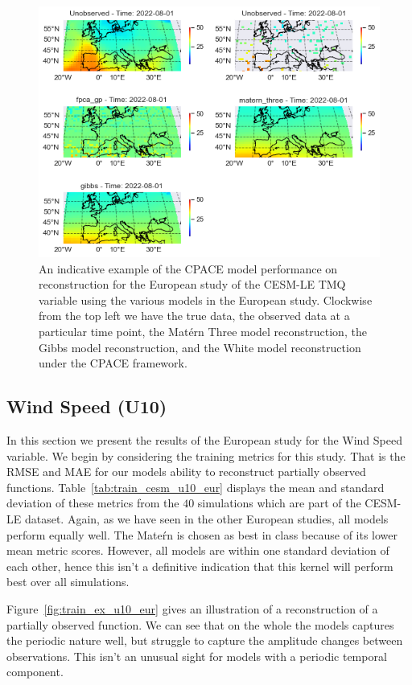 \begin{figure}
	\centering
	\includegraphics[width=\textwidth]{full_ex_tmq_eur}
	\caption{An indicative example of the CPACE model performance on reconstruction for the European study of the CESM-LE TMQ variable using the various models in the European study. Clockwise from the top left we have the true data, the observed data at a particular time point, the Mat\'ern Three model reconstruction, the Gibbs model reconstruction, and the White model reconstruction under the CPACE framework.}
	\label{fig:full_ex_tmq_eur}
\end{figure}

\subsection{Wind Speed (U10) \label{ssec:cesm_u10_eur}}
In this section we present the results of the European study for the Wind Speed variable. 
We begin by considering the training metrics for this study.
That is the RMSE and MAE for our models ability to reconstruct partially observed functions.
Table~\ref{tab:train_cesm_u10_eur} displays the mean and standard deviation of these metrics from the $40$ simulations which are part of the CESM-LE dataset. 
Again, as we have seen in the other European studies, all models perform equally well.
The Mate\'rn is chosen as best in class because of its lower mean metric scores.
However, all models are within one standard deviation of each other, hence this isn't a definitive indication that this kernel will perform best over all simulations.

Figure~\ref{fig:train_ex_u10_eur} gives an illustration of a reconstruction of a partially observed function.
We can see that on the whole the models captures the periodic nature well, but struggle to capture the amplitude changes between observations.
This isn't an unusual sight for models with a periodic temporal component.
 
